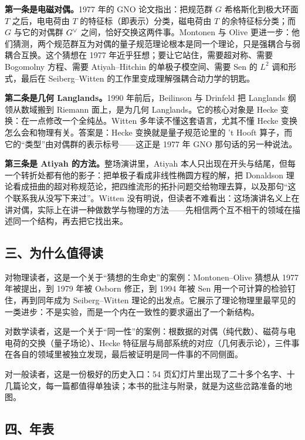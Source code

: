 \textbf{第一条是电磁对偶。}1977 年的 GNO 论文指出：把规范群 $G$ 希格斯化到极大环面 $T$ 之后，电电荷由 $T$ 的特征标（即表示）分类，磁电荷由 $T$ 的余特征标分类；而 $G$ 与它的对偶群 $G^{\vee}$ 之间，恰好交换这两件事。Montonen 与 Olive 更进一步：他们猜测，两个规范群互为对偶的量子规范理论根本是同一个理论，只是强耦合与弱耦合互换。这个猜想在 1977 年近乎狂想；要让它站住，需要超对称、需要 Bogomolny 方程、需要 Atiyah--Hitchin 的单极子模空间、需要 Sen 的 $L^2$ 调和形式，最后在 Seiberg--Witten 的工作里变成理解强耦合动力学的钥匙。

\textbf{第二条是几何 Langlands。}1990 年前后，Beilinson 与 Drinfeld 把 Langlands 纲领从数域搬到 Riemann 面上，是为几何 Langlands。它的核心对象是 Hecke 变换：在一点修改一个全纯丛。Witten 多年读不懂这套语言，尤其不懂 Hecke 变换怎么会和物理有关。答案是：Hecke 变换就是量子规范论里的 't Hooft 算子，而它的“类型”由对偶群的表示标号——这正是 1977 年 GNO 那句话的另一种说法。

\textbf{第三条是 Atiyah 的方法。}整场演讲里，Atiyah 本人只出现在开头与结尾，但每一个转折处都有他的影子：把单极子看成非线性椭圆方程的解，把 Donaldson 理论看成扭曲的超对称规范论，把四维流形的拓扑问题交给物理去算，以及那句“这个联系我从没写下来过”。Witten 没有明说，但读者不难看出：这场演讲名义上在讲对偶，实际上在讲一种做数学与物理的方法——先相信两个互不相干的领域在描述同一个结构，再去把它找出来。

\subsection*{三、为什么值得读}

对物理读者，这是一个关于“猜想的生命史”的案例：Montonen--Olive 猜想从 1977 年被提出，到 1979 年被 Osborn 修正，到 1994 年被 Sen 用一个可计算的检验钉住，再到同年成为 Seiberg--Witten 理论的出发点。它展示了理论物理里最罕见的一类进步：不是实验，而是一个内在一致性的要求逼出了一个新结构。

对数学读者，这是一个关于“同一性”的案例：根数据的对偶（纯代数）、磁荷与电电荷的交换（量子场论）、Hecke 特征层与局部系统的对应（几何表示论），三件事在各自的领域里被独立发现，最后被证明是同一件事的不同侧面。

对一般读者，这是一份极好的历史入口：54 页幻灯片里出现了二十多个名字、十几篇论文，每一篇都值得单独读；本书的批注与附录，就是为这些岔路准备的地图。

\subsection*{四、年表}

